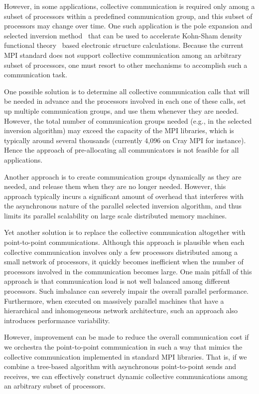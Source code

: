 \documentclass{acm_proc_article-sp}
\begin{document}
However, in some applications, collective communication
is required only among a subset of processors within a 
predefined communication group, and this subset of processors
may change over time. One such application is the pole expansion and selected
inversion
method~\cite{LinLuYingCarE2009,LinYangMezaEtAl2011,LinChenYangEtAl2013} that can be used to accelerate Kohn-Sham 
density functional theory~\cite{KohnSham1965} based electronic structure calculations.
Because the current MPI standard does not support collective
communication among an arbitrary subset of processors, one must
resort to other mechanisms to accomplish such a communication task.

One possible solution is to determine all collective communication
calls that will be needed in advance and the processors involved in 
each one of these calls, set up multiple communication
groups, and use them whenever they are needed. However, 
the total number of communication groups needed (e.g., in 
the selected inversion algorithm) may exceed 
the capacity of the MPI libraries, which is typically around 
several thousands (currently 4,096 on Cray MPI for instance).
Hence the approach of pre-allocating all communicators is not feasible
for all applications.

Another approach is to create communication groups dynamically
as they are needed, and release them when they are no longer
needed. However, this approach typically incurs a significant amount
of overhead that interferes with the asynchronous nature of the 
parallel selected inversion algorithm, and thus limits its parallel
scalability on large scale distributed memory machines.

Yet another solution is to replace the collective 
communication altogether with point-to-point communications.
Although this approach is plausible when each collective 
communication involves only a few processors distributed 
among a small network of processors, it quickly becomes inefficient
when the number of processors involved in the communication 
becomes large.  One main pitfall of this approach is that 
communication load is not well balanced among different processors. 
Such imbalance can severely impair the overall parallel performance. 
Furthermore, when executed on massively parallel
machines that have a hierarchical and inhomogeneous 
network architecture,
such an approach also introduces performance variability.

However, improvement can be made to reduce 
the overall communication cost if we orchestra the point-to-point
communication in such a way that mimics the collective communication
implemented in standard MPI libraries. That is, if we combine a
tree-based algorithm with asynchronous point-to-point sends and receives, 
we can effectively construct dynamic collective communications 
among an arbitrary subset of processors.
\end{document}
